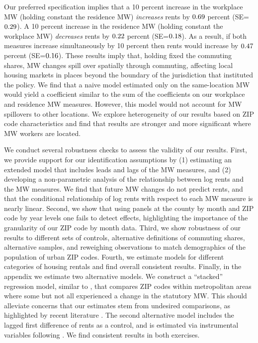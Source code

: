 
Our preferred specification implies that 
a 10 percent increase in the workplace MW (holding constant the residence MW) 
\textit{increases} rents by $\textnormal{0.69}$ percent 
(SE=$\textnormal{0.29}$).
A 10 percent increase in the residence MW (holding constant the workplace MW) 
\textit{decreases} rents by $\textnormal{0.22}$ percent 
(SE=$\textnormal{0.18}$). 
As a result, if both measures increase simultaneously by 10 percent then 
rents would increase by $\textnormal{0.47}$ percent 
(SE=$\textnormal{0.16}$).
These results imply that, holding fixed the commuting shares, MW 
changes spill over spatially through commuting, affecting local housing markets 
in places beyond the boundary of the jurisdiction that instituted the policy.
We find that a naive model estimated only on the same-location MW would yield a 
coefficient similar to the sum of the coefficients on our workplace and 
residence MW measures.
However, this model would not account for MW spillovers to other locations.
We explore heterogeneity of our results based on ZIP code characteristics and
find that results are stronger and more significant where MW workers are 
located.


We conduct several robustness checks to assess the validity of our results.
First, we provide support for our identification assumptions by
(1) estimating an extended model that includes leads and lags of the MW measures,
and 
(2) developing a non-parametric analysis of the relationship between log rents
and the MW measures.
We find that future MW changes do not predict rents, and that the conditional
relationship of log rents with respect to each MW measure is nearly linear.
Second, we show that using panels at the county by month and ZIP code by 
year levels one fails to detect effects, highlighting the importance of the 
granularity of our ZIP code by month data.
Third, we show robustness of our results to different sets of controls,
alternative definitions of commuting shares, alternative samples,
and reweighing observations to match demographics of the population of
urban ZIP codes.
Fourth, we estimate models for different categories of housing rentals and
find overall consistent results.
Finally, in the appendix we estimate two alternative models.
We construct a ``stacked'' regression model, similar to \textcite{CegnizEtAl2019},
that compares ZIP codes within metropolitan areas where some but not all 
experienced a change in the statutory MW.
This should alleviate concerns that our estimates stem from undesired 
comparisons, as highlighted by recent literature 
\parencite{deChaisemartinEtAl2022,RothEtAl2022}.
The second alternative model includes the lagged first difference of rents as 
a control, and is estimated via instrumental variables following 
\textcite{ArellanoBond1991}.
We find consistent results in both exercises.

